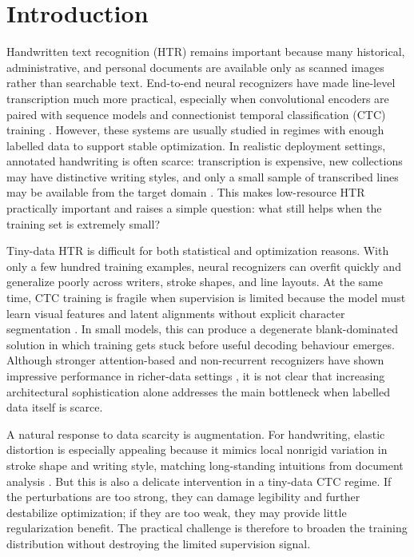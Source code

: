 \documentclass{article} %
\begin{document}
\section{Introduction}
\label{sec:intro}
Handwritten text recognition (HTR) remains important because many historical, administrative, and personal documents are available only as scanned images rather than searchable text. End-to-end neural recognizers have made line-level transcription much more practical, especially when convolutional encoders are paired with sequence models and connectionist temporal classification (CTC) training \citep{graves2006ctc,shi2016crnn}. However, these systems are usually studied in regimes with enough labelled data to support stable optimization. In realistic deployment settings, annotated handwriting is often scarce: transcription is expensive, new collections may have distinctive writing styles, and only a small sample of transcribed lines may be available from the target domain \citep{marti2002iam,michael2019evaluating}. This makes low-resource HTR practically important and raises a simple question: what still helps when the training set is extremely small?

Tiny-data HTR is difficult for both statistical and optimization reasons. With only a few hundred training examples, neural recognizers can overfit quickly and generalize poorly across writers, stroke shapes, and line layouts. At the same time, CTC training is fragile when supervision is limited because the model must learn visual features and latent alignments without explicit character segmentation \citep{graves2006ctc}. In small models, this can produce a degenerate blank-dominated solution in which training gets stuck before useful decoding behaviour emerges. Although stronger attention-based and non-recurrent recognizers have shown impressive performance in richer-data settings \citep{vaswani2017attention,kang2022pay}, it is not clear that increasing architectural sophistication alone addresses the main bottleneck when labelled data itself is scarce.

A natural response to data scarcity is augmentation. For handwriting, elastic distortion is especially appealing because it mimics local nonrigid variation in stroke shape and writing style, matching long-standing intuitions from document analysis \citep{simard2003best}. But this is also a delicate intervention in a tiny-data CTC regime. If the perturbations are too strong, they can damage legibility and further destabilize optimization; if they are too weak, they may provide little regularization benefit. The practical challenge is therefore to broaden the training distribution without destroying the limited supervision signal.
\end{document}
